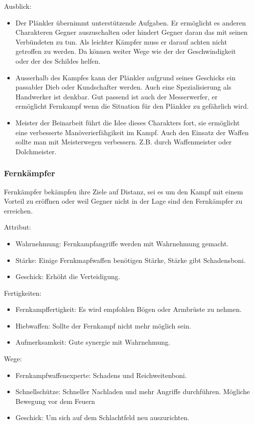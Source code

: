 \documentclass{article}
\begin{document}
Ausblick:
\begin{itemize}
\item Der Plänkler übernimmt unterstützende Aufgaben. Er ermöglicht es anderen Charakteren Gegner auszuschalten oder hindert Gegner daran das mit seinen Verbündeten zu tun. Als leichter Kämpfer muss er darauf achten nicht getroffen zu werden. Da können weiter Wege wie der der Geschwindigkeit oder der des Schildes helfen.
\item Ausserhalb des Kampfes kann der Plänkler aufgrund seines Geschicks ein passabler Dieb oder Kundschafter werden. Auch eine Spezialisierung als Handwerker ist denkbar. Gut passend ist auch der Messerwerfer, er ermöglicht Fernkampf wenn die Situation für den Plänkler zu gefährlich wird.
\item Meister der Beinarbeit führt die Idee dieses Charakters fort, sie ermöglicht eine verbesserte Manöverierfähgikeit im Kampf. Auch den Einsatz der Waffen sollte man mit Meisterwegen verbessern. Z.B. durch Waffenmeister oder Dolchmeister.
\end{itemize}

\subsubsection{Fernkämpfer}
Fernkämpfer bekämpfen ihre Ziele auf Distanz, sei es um den Kampf mit einem Vorteil zu eröffnen oder weil Gegner
nicht in der Lage sind den Fernkämpfer zu erreichen.

Attribut:
\begin{itemize}
\item Wahrnehmung: Fernkampfangriffe werden mit Wahrnehmung gemacht.
\item Stärke: Einige Fernkmapfwaffen benötigen Stärke, Stärke gibt Schadensboni.
\item Geschick: Erhöht die Verteidigung.
\end{itemize}

Fertigkeiten:
\begin{itemize}
\item Fernkampffertigkeit: Es wird empfohlen Bögen oder Armbrüste zu nehmen.
\item Hiebwaffen: Sollte der Fernkampf nicht mehr möglich sein.
\item Aufmerksamkeit: Gute synergie mit Wahrnehmung.
\end{itemize}

Wege:
\begin{itemize}
\item Fernkampfwaffenexperte: Schadens und Reichweitenboni.
\item Schnellschütze: Schneller Nachladen und mehr Angriffe durchführen. Mögliche Bewegung vor dem Feuern
\item Geschick: Um sich auf dem Schlachtfeld neu auszurichten.
\end{itemize}
\end{document}

